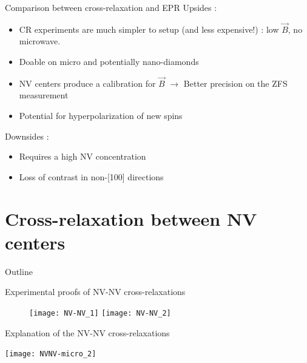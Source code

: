 \documentclass{beamer}
\begin{document}
\begin{frame}{Comparison between cross-relaxation and EPR}
Upsides :
\begin{itemize}
\item CR experiments are much simpler to setup (and less expensive!) : low $\vec B$, no microwave.
\item Doable on micro and potentially nano-diamonds
\pause
\item NV centers produce a calibration for $\vec B$ $\to$ Better precision on the ZFS measurement
\pause
\item Potential for hyperpolarization of new spins
\pause
\end{itemize}
Downsides :
\begin{itemize}
\item Requires a high NV concentration
\pause
\item Loss of contrast in non-[100] directions
\end{itemize}
\end{frame}
\section{Cross-relaxation between NV centers}
\begin{frame}{Outline}
\tableofcontents[currentsection]
\end{frame}
\begin{frame}{Experimental proofs of NV-NV cross-relaxations}
\begin{figure}
    \begin{overprint}
    \texttt{[image: NV-NV\_1]}
    \texttt{[image: NV-NV\_2]}
    \end{overprint}
\end{figure}
\end{frame}
\begin{frame}{Explanation of the NV-NV cross-relaxations}





\pause
\centering
\texttt{[image: NVNV-micro\_2]}
\end{frame}
\end{document}
